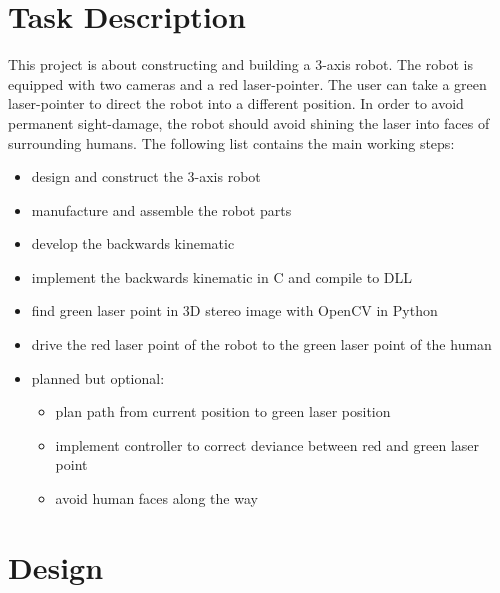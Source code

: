\documentclass[./\jobname.tex]{subfiles}
\begin{document}

\chapter{Task Description}

This project is about constructing and building a 3-axis robot. The robot is equipped with two cameras and a red laser-pointer. The user can take a green laser-pointer to direct the robot into a different position. In order to avoid permanent sight-damage, the robot should avoid shining the laser into faces of surrounding humans. The following list contains the main working steps:

\begin{itemize}
	\item design and construct the 3-axis robot 
	\item manufacture and assemble the robot parts 
	\item develop the backwards kinematic 
	\item implement the backwards kinematic in C and compile to DLL 
	\item find green laser point in 3D stereo image with OpenCV in Python 
	\item drive the red laser point of the robot to the green laser point of the human
	\item planned but optional: 
	\begin{itemize}
		\item plan path from current position to green laser position 
		\item implement controller to correct deviance between red and green laser point 
		\item avoid human faces along the way
	\end{itemize}
	
\end{itemize}


\chapter{Design}
\end{document}
